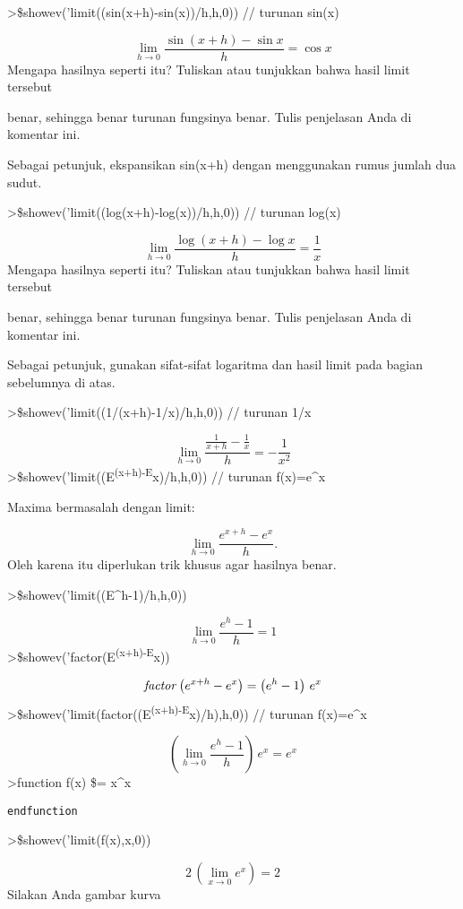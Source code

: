 \documentclass[
]{book}
\begin{document}
\textgreater\$showev('limit((sin(x+h)-sin(x))/h,h,0)) // turunan sin(x)

\[\lim_{h\rightarrow 0}{\frac{\sin \left(x+h\right)-\sin x}{h}}=\cos x\]Mengapa hasilnya seperti itu? Tuliskan atau tunjukkan bahwa hasil limit tersebut

benar, sehingga benar turunan fungsinya benar. Tulis penjelasan Anda di komentar ini.

Sebagai petunjuk, ekspansikan sin(x+h) dengan menggunakan rumus jumlah dua sudut.

\textgreater\$showev('limit((log(x+h)-log(x))/h,h,0)) // turunan log(x)

\[\lim_{h\rightarrow 0}{\frac{\log \left(x+h\right)-\log x}{h}}=\frac{1}{x}\]Mengapa hasilnya seperti itu? Tuliskan atau tunjukkan bahwa hasil limit tersebut

benar, sehingga benar turunan fungsinya benar. Tulis penjelasan Anda di komentar ini.

Sebagai petunjuk, gunakan sifat-sifat logaritma dan hasil limit pada bagian sebelumnya di atas.

\textgreater\$showev('limit((1/(x+h)-1/x)/h,h,0)) // turunan 1/x

\[\lim_{h\rightarrow 0}{\frac{\frac{1}{x+h}-\frac{1}{x}}{h}}=-\frac{1}{x^2}\]\textgreater\$showev('limit((E\textsuperscript{(x+h)-E}x)/h,h,0)) // turunan f(x)=e\^{}x

Maxima bermasalah dengan limit:

\[\lim_{h\to 0}\frac{e^{x+h}-e^x}{h}.\]Oleh karena itu diperlukan trik khusus agar hasilnya benar.

\textgreater\$showev('limit((E\^{}h-1)/h,h,0))

\[\lim_{h\rightarrow 0}{\frac{e^{h}-1}{h}}=1\]\textgreater\$showev('factor(E\textsuperscript{(x+h)-E}x))

\[{\it factor}\left(e^{x+h}-e^{x}\right)=\left(e^{h}-1\right)\,e^{x}\]\textgreater\$showev('limit(factor((E\textsuperscript{(x+h)-E}x)/h),h,0)) // turunan f(x)=e\^{}x

\[\left(\lim_{h\rightarrow 0}{\frac{e^{h}-1}{h}}\right)\,e^{x}=e^{x}\]\textgreater function f(x) \$= x\^{}x

\begin{verbatim}
endfunction
\end{verbatim}

\textgreater\$showev('limit(f(x),x,0))

\[2\,\left(\lim_{x\rightarrow 0}{e^{x}}\right)=2\]Silakan Anda gambar kurva
\end{document}
